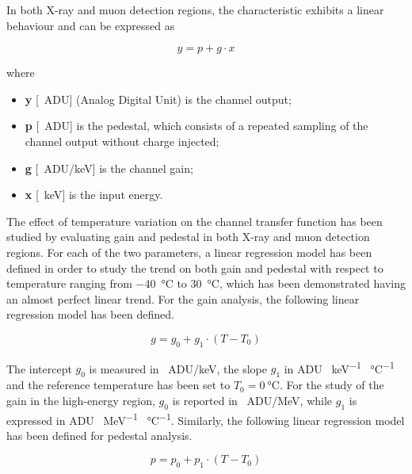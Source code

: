 \noindent
In both X-ray and muon detection regions, the characteristic exhibits a linear behaviour and can be expressed as

\begin{equation}
    y = p + g \cdot x
    \label{FDTlinearModel}
\end{equation}

\noindent
where

\begin{itemize}
    \itemsep0em
    \item \textbf{y} [\SI{}{ADU}] (Analog Digital Unit) is the channel output;
    \item \textbf{p} [\SI{}{ADU}] is the pedestal, which consists of a repeated sampling of the channel output without charge injected;
    \item \textbf{g} [\SI{}{ADU/\kilo\electronvolt}] is the channel gain;
    \item \textbf{x} [\SI{}{\kilo\electronvolt}] is the input energy.
\end{itemize}

The effect of temperature variation on the channel transfer function has been studied by evaluating gain and pedestal in both X-ray and muon detection regions. For each of the two parameters, a linear regression model has been defined in order to study the trend on both gain and pedestal with respect to temperature ranging from \SI{-40}{\celsius} to \SI{30}{\celsius}, which has been demonstrated having an almost perfect linear trend. For the gain analysis, the following linear regression model has been defined.

\begin{equation}
    g = g_{\textit{0}} + g_{\textit{1}} \cdot (T - T_{\textit{0}})
    \label{equationGain}
\end{equation}

\noindent
The intercept $g_{\textit{0}}$ is measured in \SI{}{ADU/\kilo\electronvolt}, the slope $g_{\textit{1}}$ in ADU \SI{}{\kilo\electronvolt^{-1}} \SI{}{\celsius^{-1}} and the reference temperature has been set to $T_{\textit{0}} = \SI{0}{\celsius}$. For the study of the gain in the high-energy region, $g_{0}$ is reported in \SI{}{ADU/\mega\electronvolt}, while $g_{1}$ is expressed in ADU \SI{}{\mega\electronvolt^{-1}} \SI{}{\celsius^{-1}}. Similarly, the following linear regression model has been defined for pedestal analysis.

\begin{equation}
    p = p_{\textit{0}} + p_{\textit{1}} \cdot (T - T_{\textit{0}})
\end{equation}


